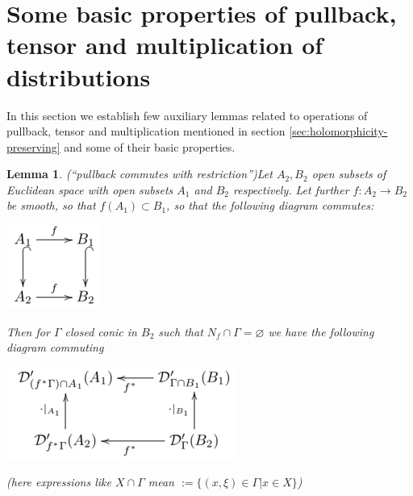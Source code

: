 \documentclass{article}
\newcommand{\assign}{:=}
\numberwithin{definition}{section}
\newtheorem{lemma}{Lemma}
\numberwithin{lemma}{section}
\numberwithin{proposition}{section}
{\theorembodyfont{\rmfamily}\newtheorem{remark}{Remark}
\numberwithin{remark}{section}
}
\begin{document}
\section{Some basic properties of pullback, tensor and multiplication of
distributions}\label{sec:pull-tensor-mult}

In this section we establish few auxiliary lemmas related to operations of
pullback, tensor and multiplication mentioned in section
\ref{sec:holomorphicity-preserving} and some of their basic properties.

\begin{lemma}
  \label{KR-normalization-recur:lem-pull-comm-restr}(``pullback commutes with
  restriction'')Let $A_2, B_2$ open subsets of Euclidean space with open
  subsets $A_1$ and $B_2$ respectively. Let further $f : A_2 \rightarrow B_2$
  be smooth, so that $f ( A_1) \subset B_1$, so that the following diagram
  commutes:
  
  \begin{center}
	  \includegraphics[scale=0.6]{master_master-1.png}
  \end{center}
  
  Then for $\Gamma$ closed conic in $B_2$ such that $N_f \cap \Gamma =
  \varnothing$ we have the following diagram commuting
  \begin{center}
    \includegraphics[scale=0.6]{master_master-2.png}
    
    
  \end{center}
  (here expressions like $X \cap \Gamma$ mean $\assign \{ ( x, \xi) \in \Gamma
  | x \in X \}$)
\end{lemma}
\end{document}
